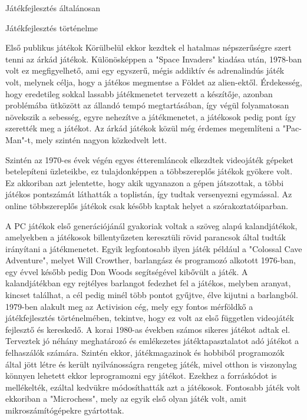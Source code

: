 \begin{MyChapter}{Játékfejlesztés általánosan}
\begin{MySection}{Játékfejlesztés történelme}
\begin{MySubSection}{Első publikus játékok}
			Körülbelül ekkor kezdtek el hatalmas népszerűségre szert tenni az árkád játékok. Különösképpen a "Space Invaders" kiadása után, 1978-ban volt ez megfigyelhető, ami egy egyszerű, mégis addiktív és adrenalindús játék volt, melynek célja, hogy a játékos megmentse a Földet az alien-ektől. Érdekesség, hogy eredetileg sokkal lassabb játékmenetet tervezett a készítője, azonban problémába ütközött az állandó tempó megtartásában, így végül folyamatosan növekszik a sebesség, egyre nehezítve a játékmenetet, a játékosok pedig pont így szerették meg a játékot. Az árkád játékok közül még érdemes megemlíteni a "Pac-Man"-t, mely szintén nagyon közkedvelt lett.
						
			Szintén az 1970-es évek végén egyes étteremláncok elkezdtek videojáték gépeket betelepíteni üzleteikbe, ez tulajdonképpen a többszereplős játékok gyökere volt. Ez akkoriban azt jelentette, hogy akik ugyanazon a gépen játszottak, a többi játékos pontszámát láthatták a toplistán, így tudtak versenyezni egymással. Az online többszereplős játékok csak később kaptak helyet a szórakoztatóiparban.
			
			A PC játékok első generációjánál gyakoriak voltak a szöveg alapú kalandjátékok, amelyekben a játékosok billentyűzeten keresztüli rövid parancsok által tudták irányítani a játékmenetet. Egyik legfontosabb ilyen játék például a "Colossal Cave Adventure", melyet Will Crowther, barlangász és programozó alkotott 1976-ban, egy évvel később pedig Don Woods segítségével kibővült a játék. A kalandjátékban egy rejtélyes barlangot fedezhet fel a játékos, melyben aranyat, kincset találhat, a cél pedig minél több pontot gyűjtve, élve kijutni a barlangból.
			1979-ben alakult meg az Activision cég, mely egy fontos mérföldkő a játékfejlesztés történelmében, tekintve, hogy ez volt az első független videojáték fejlesztő és kereskedő. A korai 1980-as években számos sikeres játékot adtak el. Terveztek jó néhány meghatározó és emlékezetes játéktapasztalatot adó játékot a felhaszálók számára.
			Szintén ekkor, játékmagazinok és hobbiból programozók által jött létre és került nyilvánosságra rengeteg játék, mivel otthon is viszonylag könnyen lehetett ekkor leprogramozni egy játékot. Ezekhez a forráskódot is mellékelték, ezáltal kedvükre módosíthatták azt a játékosok. Fontosabb játék volt ekkoriban a "Microchess", mely az egyik első olyan játék volt, amit mikroszámítógépekre gyártottak.
		\end{MySubSection}
		

\end{MySection}
\end{MyChapter}
